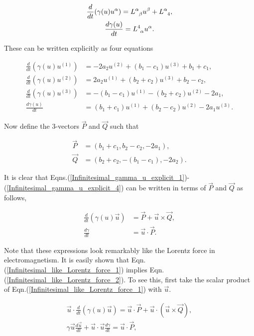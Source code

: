 \begin{gather*} 
\frac{d}{dt} (\gamma(u) u^{\alpha}) = \tensor{L}{^{\alpha}_{\beta}} u^{\beta} + \tensor{L}{^{\alpha}_{4}}, \\
\frac{d\gamma(u)}{dt} = \tensor{L}{^{4}_{\alpha}} u^{\alpha}.
\end{gather*} 

\noindent These can be written explicitly as four equations

\begin{align}\label{Infinitesimal_gamma_u_explicit_1}
\frac{d}{dt} (\gamma(u) u^{(1)}) & = -2a_2u^{(2)} + (b_1 - c_1)u^{(3)} + b_1 + c_1, \\ \label{Infinitesimal_gamma_u_explicit_2}
\frac{d}{dt} (\gamma(u) u^{(2)}) & = 2a_2 u^{(1)} + (b_2 + c_2) u^{(3)} + b_2 - c_2,\\ \label{Infinitesimal_gamma_u_explicit_3}
\frac{d}{dt} (\gamma(u) u^{(3)}) & = -(b_1 - c_1) u^{(1)} - (b_2 + c_2 )u^{(2)} - 2a_1,\\ \label{Infinitesimal_gamma_u_explicit_4}
\frac{d\gamma(u)}{dt} & = (b_1 + c_1)u^{(1)} + (b_2 - c_2) u^{(2)} - 2a_1 u^{(3)}.
\end{align}

Now define the $3$-vectors $\vec{P}$ and $\vec{Q}$ such that

\begin{align*}
\vec{P} & = (b_1+c_1,b_2-c_2,-2a_1), \\
\vec{Q} & = (b_2 + c_2, -(b_1 - c_1),-2a_2).
\end{align*}

It is clear that Eqns.(\ref{Infinitesimal_gamma_u_explicit_1})-(\ref{Infinitesimal_gamma_u_explicit_4}) can be written in terms of $\vec{P}$ and $\vec{Q}$ as follows,

\begin{align}\label{Infinitesimal_like_Lorentz_force_1}
\frac{d}{dt} (\gamma(u)\vec{u}) & = \vec{P} + \vec{u} \times \vec{Q}, \\ \label{Infinitesimal_like_Lorentz_force_2}
\frac{d\gamma}{dt} & = \vec{u} \cdot \vec{P}.
\end{align}

\noindent Note that these expressions look remarkably like the Lorentz force in electromagnetism. It is easily shown that Eqn.(\ref{Infinitesimal_like_Lorentz_force_1}) implies Eqn.(\ref{Infinitesimal_like_Lorentz_force_2}). To see this, first take the scalar product of Eqn.(\ref{Infinitesimal_like_Lorentz_force_1}) with $\vec{u}$.

\begin{gather}\label{Infinitesimal_1_imples_2_calc_1}
\vec{u} \cdot \frac{d}{dt} (\gamma(u)\vec{u}) = \vec{u} \cdot \vec{P} + \vec{u} \cdot (\vec{u} \times \vec{Q}), \\ \label{Infinitesimal_1_imples_2_calc_2}
\gamma \vec{u} \frac{d\vec{u}}{dt} + \vec{u} \cdot \vec{u} \frac{d\gamma}{dt} = \vec{u} \cdot \vec{P},
\end{gather}

